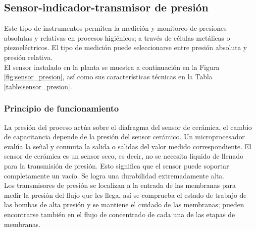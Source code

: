 \subsection{Sensor-indicador-transmisor de presión}

Este tipo de instrumentos permiten la medición y monitoreo de presiones
absolutas y relativas en procesos higiénicos; a través de células metálicas o
piezoeléctricos. El tipo de medición puede seleccionarse entre presión absoluta
y presión relativa. \\

El sensor instalado en la planta se muestra a continuación en la Figura
\ref{fig:sensor_presion}, así como sus características técnicas en la Tabla \ref{table:sensor_presion}.


\subsubsection*{Principio de funcionamiento}

La presión del proceso actúa sobre el diafragma del sensor de cerámica,
el cambio de capacitancia depende de la presión del sensor cerámico. Un
microprocesador evalúa la señal y conmuta la salida o salidas del valor medido
correspondiente. El sensor de cerámica es un sensor seco, es decir, no se
necesita líquido de llenado para la transmisión de presión. Esto significa que el
sensor puede soportar completamente un vacío. Se logra una durabilidad
extremadamente alta.\\

Los transmisores de presión se localizan a la entrada de las membranas
para medir la presión del flujo que les llega, así se comprueba el estado de
trabajo de las bombas de alta presión y se mantiene el cuidado de las
membranas; pueden encontrarse también en el flujo de concentrado de cada una
de las etapas de membranas.\\ 



